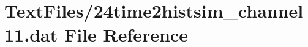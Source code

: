 \hypertarget{24time2histsim__channel11_8dat}{}\section{Text\+Files/24time2histsim\+\_\+channel11.dat File Reference}
\label{24time2histsim__channel11_8dat}
